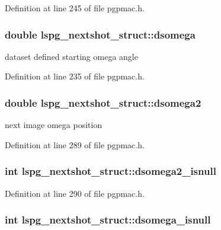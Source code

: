 Definition at line 245 of file pgpmac.\-h.

\hypertarget{structlspg__nextshot__struct_a4be525bb32fb0232c21a91529f1e8c73}{
\subsubsection[{dsomega}]{\setlength{\rightskip}{0pt plus 5cm}double lspg\-\_\-nextshot\-\_\-struct\-::dsomega}}\label{structlspg__nextshot__struct_a4be525bb32fb0232c21a91529f1e8c73}


dataset defined starting omega angle 



Definition at line 235 of file pgpmac.\-h.

\hypertarget{structlspg__nextshot__struct_a84ae35abfa725d1bdbff5403f6384ee4}{
\subsubsection[{dsomega2}]{\setlength{\rightskip}{0pt plus 5cm}double lspg\-\_\-nextshot\-\_\-struct\-::dsomega2}}\label{structlspg__nextshot__struct_a84ae35abfa725d1bdbff5403f6384ee4}


next image omega position 



Definition at line 289 of file pgpmac.\-h.

\hypertarget{structlspg__nextshot__struct_afaf9bdf89a68e7f479969072643e55eb}{
\subsubsection[{dsomega2\-\_\-isnull}]{\setlength{\rightskip}{0pt plus 5cm}int lspg\-\_\-nextshot\-\_\-struct\-::dsomega2\-\_\-isnull}}\label{structlspg__nextshot__struct_afaf9bdf89a68e7f479969072643e55eb}


Definition at line 290 of file pgpmac.\-h.

\hypertarget{structlspg__nextshot__struct_ad1da3548dc642d415aed53dc165c44fc}{
\subsubsection[{dsomega\-\_\-isnull}]{\setlength{\rightskip}{0pt plus 5cm}int lspg\-\_\-nextshot\-\_\-struct\-::dsomega\-\_\-isnull}}\label{structlspg__nextshot__struct_ad1da3548dc642d415aed53dc165c44fc}


